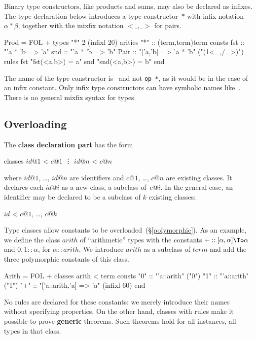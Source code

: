 Binary type constructors, like products and sums, may also be declared as
infixes.  The type declaration below introduces a type constructor~$*$ with
infix notation $\alpha*\beta$, together with the mixfix notation
${<}\_,\_{>}$ for pairs.  
\begin{ttbox}
Prod = FOL +
types   "*" 2                                 (infixl 20)
arities "*"     :: (term,term)term
consts  fst     :: "'a * 'b => 'a"
        snd     :: "'a * 'b => 'b"
        Pair    :: "['a,'b] => 'a * 'b"       ("(1<_,/_>)")
rules   fst     "fst(<a,b>) = a"
        snd     "snd(<a,b>) = b"
end
\end{ttbox}

\begin{warn}
The name of the type constructor is~{\tt *} and not {\tt op~*}, as it would
be in the case of an infix constant.  Only infix type constructors can have
symbolic names like~{\tt *}.  There is no general mixfix syntax for types.
\end{warn}


\subsection{Overloading}
The {\bf class declaration part} has the form
\begin{ttbox}
classes \(id@1\) < \(c@1\)
        \vdots
        \(id@n\) < \(c@n\)
\end{ttbox}
where $id@1$, \ldots, $id@n$ are identifiers and $c@1$, \ldots, $c@n$ are
existing classes.  It declares each $id@i$ as a new class, a subclass
of~$c@i$.  In the general case, an identifier may be declared to be a
subclass of $k$ existing classes:
\begin{ttbox}
        \(id\) < \(c@1\), \ldots, \(c@k\)
\end{ttbox}
Type classes allow constants to be overloaded~(\S\ref{polymorphic}).  As an
example, we define the class $arith$ of ``arithmetic'' types with the
constants ${+} :: [\alpha,\alpha]\To \alpha$ and $0,1 :: \alpha$, for
$\alpha{::}arith$.  We introduce $arith$ as a subclass of $term$ and add
the three polymorphic constants of this class.
\begin{ttbox}
Arith = FOL +
classes arith < term
consts  "0"     :: "'a::arith"                  ("0")
        "1"     :: "'a::arith"                  ("1")
        "+"     :: "['a::arith,'a] => 'a"       (infixl 60)
end
\end{ttbox}
No rules are declared for these constants: we merely introduce their
names without specifying properties.  On the other hand, classes
with rules make it possible to prove {\bf generic} theorems.  Such
theorems hold for all instances, all types in that class.

